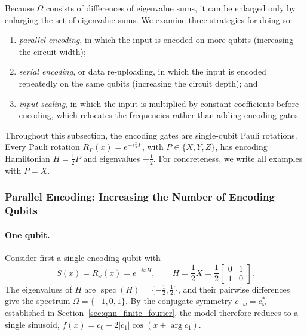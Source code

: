 \documentclass[12pt]{article}
\numberwithin{equation}{section}  %
\begin{document}
Because $\Omega$ consists of differences of eigenvalue sums, it can be enlarged only by enlarging the set of eigenvalue sums. We examine three strategies for doing so:
\begin{enumerate}
\item \emph{parallel encoding}, in which the input is encoded on more qubits (increasing the circuit width);
\item \emph{serial encoding}, or data re-uploading, in which the input is encoded repeatedly on the same qubits (increasing the circuit depth); and
\item \emph{input scaling}, in which the input is multiplied by constant coefficients before encoding, which relocates the frequencies rather than adding encoding gates.
\end{enumerate}
Throughout this subsection, the encoding gates are single-qubit Pauli rotations. Every Pauli rotation $R_P(x) = e^{-i\frac{x}{2}P}$, with $P \in \{X, Y, Z\}$, has encoding Hamiltonian $H = \frac{1}{2}P$ and eigenvalues $\pm\frac{1}{2}$. For concreteness, we write all examples with $P = X$.

\subsubsection{Parallel Encoding: Increasing the Number of Encoding Qubits}
\label{sec:parallel_encoding}

\paragraph{One qubit.} Consider first a single encoding qubit with
\begin{equation}
S(x) = R_x(x) = e^{-ixH}, \qquad H = \frac{1}{2}X = \frac{1}{2}\begin{bmatrix} 0 & 1 \\ 1 & 0 \end{bmatrix}.
\end{equation}
The eigenvalues of $H$ are $\operatorname{spec}(H) = \{-\frac{1}{2}, \frac{1}{2}\}$, and their pairwise differences give the spectrum $\Omega = \{-1, 0, 1\}$. By the conjugate symmetry $c_{-\omega} = c_\omega^*$ established in Section~\ref{sec:qnn_finite_fourier}, the model therefore reduces to a single sinusoid, $f(x) = c_0 + 2|c_1|\cos(x + \arg c_1)$.
\end{document}
